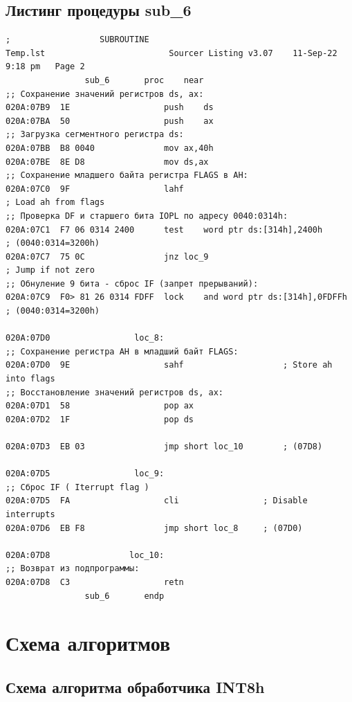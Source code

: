 \documentclass[a4paper,14pt]{article}
\begin{document}
\subsection{Листинг процедуры sub\_6}
\begin{lstlisting}[style={asm}]
;			       SUBROUTINE
Temp.lst						 Sourcer Listing v3.07    11-Sep-22   9:18 pm   Page 2
				sub_6		proc	near
;; Сохранение значений регистров ds, ax:
020A:07B9  1E					push	ds
020A:07BA  50					push	ax
;; Загрузка сегментного регистра ds:
020A:07BB  B8 0040				mov	ax,40h
020A:07BE  8E D8				mov	ds,ax
;; Сохранение младшего байта регистра FLAGS в AH:
020A:07C0  9F					lahf									; Load ah from flags
;; Проверка DF и старшего бита IOPL по адресу 0040:0314h:
020A:07C1  F7 06 0314 2400		test	word ptr ds:[314h],2400h		; (0040:0314=3200h)
020A:07C7  75 0C				jnz	loc_9								; Jump if not zero
;; Обнуление 9 бита - сброс IF (запрет прерываний):
020A:07C9  F0> 81 26 0314 FDFF	lock	and	word ptr ds:[314h],0FDFFh	; (0040:0314=3200h)

020A:07D0			      loc_8:
;; Сохранение регистра AH в младший байт FLAGS:
020A:07D0  9E					sahf					; Store ah into flags
;; Восстановление значений регистров ds, ax:
020A:07D1  58					pop	ax
020A:07D2  1F					pop	ds

020A:07D3  EB 03				jmp	short loc_10		; (07D8)

020A:07D5			      loc_9:
;; Сброс IF ( Iterrupt flag )
020A:07D5  FA					cli					; Disable interrupts
020A:07D6  EB F8				jmp	short loc_8		; (07D0)

020A:07D8			     loc_10:
;; Возврат из подпрограммы:
020A:07D8  C3					retn
				sub_6		endp	
\end{lstlisting}
\clearpage
\section{Схема алгоритмов}
\subsection{Схема алгоритма обработчика INT8h}
\end{document}
